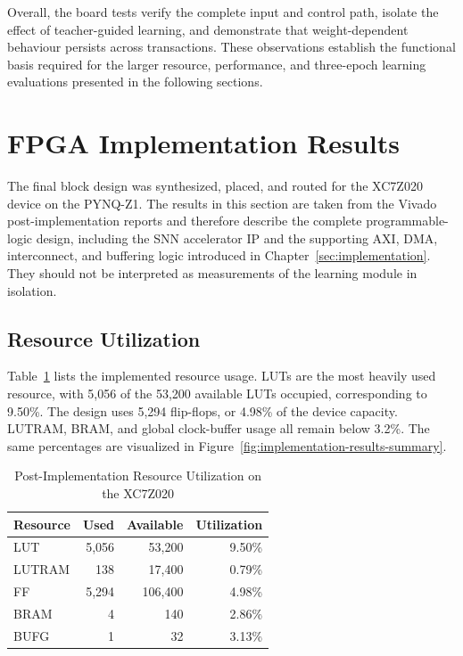 Overall, the board tests verify the complete input and control path, isolate the effect of teacher-guided learning, and demonstrate that weight-dependent behaviour persists across transactions. These observations establish the functional basis required for the larger resource, performance, and three-epoch learning evaluations presented in the following sections.

\section{FPGA Implementation Results}
\label{subsec:fpga-implementation-results}

The final block design was synthesized, placed, and routed for the XC7Z020 device on the PYNQ-Z1. The results in this section are taken from the Vivado post-implementation reports and therefore describe the complete programmable-logic design, including the SNN accelerator IP and the supporting AXI, DMA, interconnect, and buffering logic introduced in Chapter~\ref{sec:implementation}. They should not be interpreted as measurements of the learning module in isolation.

\subsection{Resource Utilization}

Table~\ref{tab:implementation-resource-utilization} lists the implemented resource usage. LUTs are the most heavily used resource, with 5,056 of the 53,200 available LUTs occupied, corresponding to 9.50\%. The design uses 5,294 flip-flops, or 4.98\% of the device capacity. LUTRAM, BRAM, and global clock-buffer usage all remain below 3.2\%. The same percentages are visualized in Figure~\ref{fig:implementation-results-summary}.

\begin{table}[htbp]
	\centering
	\caption{Post-Implementation Resource Utilization on the XC7Z020}
	\label{tab:implementation-resource-utilization}
	\small
	\begin{tabular}{@{}lrrr@{}}
		\toprule
		\textbf{Resource} & \textbf{Used} & \textbf{Available} & \textbf{Utilization} \\
		\midrule
		LUT    & 5,056 & 53,200  & 9.50\% \\
		LUTRAM & 138   & 17,400  & 0.79\% \\
		FF     & 5,294 & 106,400 & 4.98\% \\
		BRAM   & 4     & 140     & 2.86\% \\
		BUFG   & 1     & 32      & 3.13\% \\
		\bottomrule
	\end{tabular}
\end{table}

